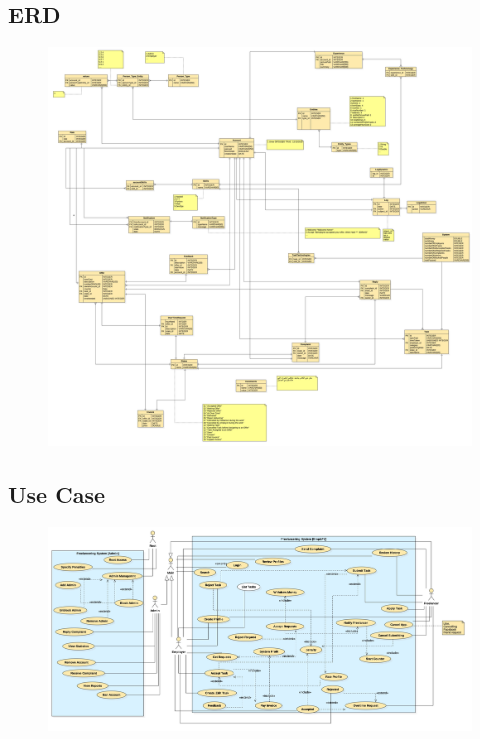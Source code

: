\documentclass{article}
\begin{document}
\subsection{ERD}
\begin{figure}[ht!]
\centering
\includegraphics[width=128mm]{ERDDiagram1}
\end{figure}

\newpage

\subsection{Use Case}
\begin{figure}[ht!]
\centering
\includegraphics[width=128mm]{UseCaseDiagram_Version1}
\end{figure}

\newpage
\end{document}

